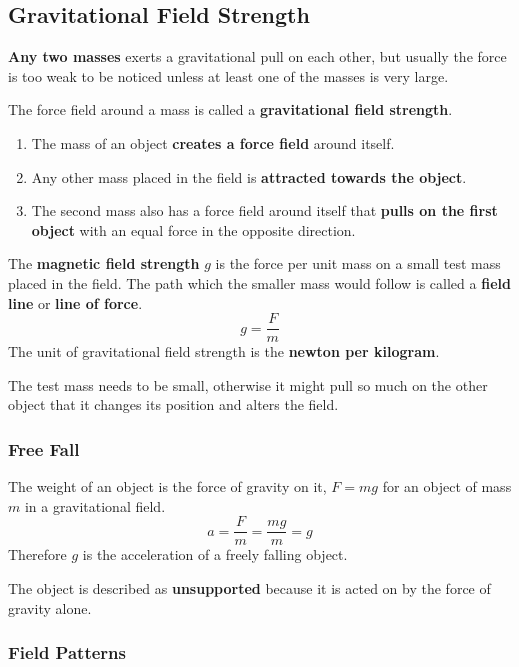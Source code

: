 \subsection{Gravitational Field Strength}

\textbf{Any two masses} exerts a gravitational pull on each other, but usually the force is too weak to be noticed unless at least one of the masses is very large.

The force field around a mass is called a \textbf{gravitational field strength}.
\begin{enumerate}
    \item The mass of an object \textbf{creates a force field} around itself.
    \item Any other mass placed in the field is \textbf{attracted towards the object}.
    \item The second mass also has a force field around itself that \textbf{pulls on the first object} with an equal force in the opposite direction.
\end{enumerate}

The \textbf{magnetic field strength} $g$ is the force per unit mass on a small test mass placed in the field. The path which the smaller mass would follow is called a \textbf{field line} or \textbf{line of force}.
$$g=\frac{F}{m}$$
The unit of gravitational field strength is the \textbf{newton per kilogram}.

The test mass needs to be small, otherwise it might pull so much on the other object that it changes its position and alters the field.

\subsubsection*{Free Fall}

The weight of an object is the force of gravity on it, $F=mg$ for an object of mass $m$ in a gravitational field.
$$a=\frac{F}{m}=\frac{mg}{m}=g$$
Therefore $g$ is the acceleration of a freely falling object.

The object is described as \textbf{unsupported} because it is acted on by the force of gravity alone.

\subsubsection*{Field Patterns}

